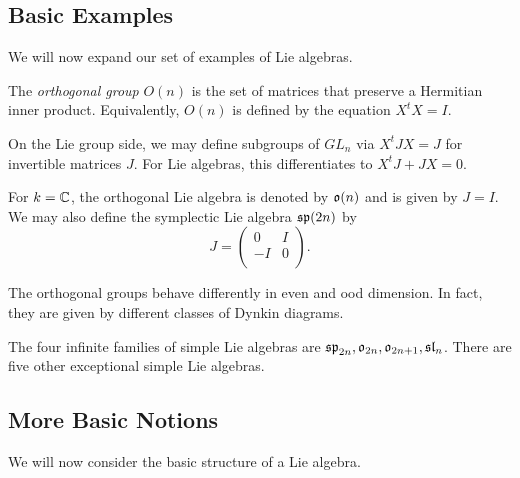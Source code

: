 \documentclass[twoside, 10pt]{article}
\begin{document}
    \subsection{Basic Examples}%
    
    

    We will now expand our set of examples of Lie algebras.

    \begin{exm} The \textit{orthogonal group} $O(n)$ is the set of matrices
    that preserve a Hermitian inner product. Equivalently, $O(n)$ is defined by
the equation $X^tX = I$.  \end{exm}

    \begin{rmk} On the Lie group side, we may define subgroups of $GL_n$ via
    $X^tJX = J$ for invertible matrices $J$. For Lie algebras, this
differentiates to $X^tJ + JX = 0$.  \end{rmk}

    \begin{exm} For $k = \mathbb{C}$, the orthogonal Lie algebra is denoted by
        $\mathfrak{o}(n)$ and is given by $J = I$. We may also define the symplectic
        Lie algebra $\mathfrak{sp}(2n)$ by \[J = \begin{pmatrix} 0 & I \\ -I & 0 \\
        \end{pmatrix}. \] \end{exm}

    \begin{rmk} The orthogonal groups behave differently in even and ood
    dimension. In fact, they are given by different classes of Dynkin diagrams.
\end{rmk}

    \begin{rmk} The four infinite families of simple Lie algebras are
    $\mathfrak{sp}_{2n}, \mathfrak{o}_{2n}, \mathfrak{o}_{2n+1}, \mathfrak{sl}_n$. There are five other
exceptional simple Lie algebras.  \end{rmk}

    \subsection{More Basic Notions}%
    
    

    We will now consider the basic structure of a Lie algebra.
\end{document}
